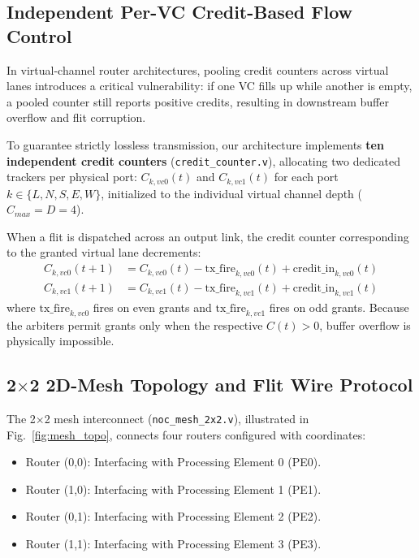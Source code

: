 \documentclass[conference]{IEEEtran}
\begin{document}
\subsection{Independent Per-VC Credit-Based Flow Control}
In virtual-channel router architectures, pooling credit counters across virtual lanes introduces a critical vulnerability: if one VC fills up while another is empty, a pooled counter still reports positive credits, resulting in downstream buffer overflow and flit corruption. 

To guarantee strictly lossless transmission, our architecture implements \textbf{ten independent credit counters} (\texttt{credit\_counter.v}), allocating two dedicated trackers per physical port: $C_{k, vc0}(t)$ and $C_{k, vc1}(t)$ for each port $k \in \{L, N, S, E, W\}$, initialized to the individual virtual channel depth ($C_{max} = D = 4$).

When a flit is dispatched across an output link, the credit counter corresponding to the granted virtual lane decrements:
\begin{align}
    C_{k, vc0}(t+1) &= C_{k, vc0}(t) - \text{tx\_fire}_{k, vc0}(t) + \text{credit\_in}_{k, vc0}(t) \\
    C_{k, vc1}(t+1) &= C_{k, vc1}(t) - \text{tx\_fire}_{k, vc1}(t) + \text{credit\_in}_{k, vc1}(t)
\end{align}
where $\text{tx\_fire}_{k, vc0}$ fires on even grants and $\text{tx\_fire}_{k, vc1}$ fires on odd grants. Because the arbiters permit grants only when the respective $C(t) > 0$, buffer overflow is physically impossible.

\subsection{2$\times$2 2D-Mesh Topology and Flit Wire Protocol}
The 2$\times$2 mesh interconnect (\texttt{noc\_mesh_2x2.v}), illustrated in Fig.~\ref{fig:mesh_topo}, connects four routers configured with coordinates:
\begin{itemize}
    \item Router (0,0): Interfacing with Processing Element 0 (PE0).
    \item Router (1,0): Interfacing with Processing Element 1 (PE1).
    \item Router (0,1): Interfacing with Processing Element 2 (PE2).
    \item Router (1,1): Interfacing with Processing Element 3 (PE3).
\end{itemize}
\end{document}
